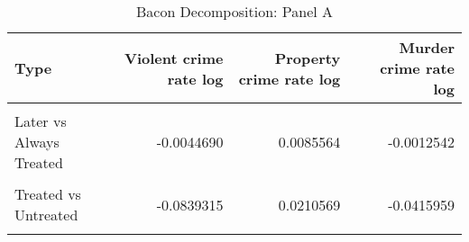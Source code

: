 \begin{table}[H]

\caption{\label{tab:tab:bacondecompositiona}Bacon Decomposition: Panel A}
\centering
\begin{tabular}[t]{lrrr}
\toprule
Type & Violent crime rate log & Property crime rate log & Murder crime rate log\\
\midrule
\cellcolor{gray!6}{Earlier vs Later Treated} & \cellcolor{gray!6}{0.0051705} & \cellcolor{gray!6}{-0.0007191} & \cellcolor{gray!6}{0.0054525}\\
Later vs Always Treated & -0.0044690 & 0.0085564 & -0.0012542\\
\cellcolor{gray!6}{Later vs Earlier Treated} & \cellcolor{gray!6}{-0.0017883} & \cellcolor{gray!6}{0.0001507} & \cellcolor{gray!6}{0.0000418}\\
Treated vs Untreated & -0.0839315 & 0.0210569 & -0.0415959\\
\cellcolor{gray!6}{Total TWFE} & \cellcolor{gray!6}{-0.0850183} & \cellcolor{gray!6}{0.0290449} & \cellcolor{gray!6}{-0.0373558}\\
\bottomrule
\end{tabular}
\end{table}
